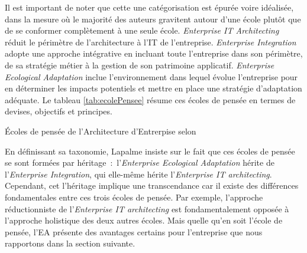 
Il est important de noter que cette une catégorisation est épurée voire 
idéalisée, 
dans la mesure où le majorité des auteurs gravitent autour d'une école plutôt 
que 
de se conformer complètement à une seule école. \textit{Enterprise IT 
Architecting} réduit le périmètre de l'architecture à l'IT de l'entreprise. 
\textit{Enterprise Integration} adopte une approche intégrative en incluant 
toute l'entreprise dans son périmètre, de sa stratégie métier à la gestion de 
son 
patrimoine applicatif. \textit{Enterprise Ecological Adaptation} inclue 
l'environnement dans lequel évolue l'entreprise pour en déterminer les impacts 
potentiels et mettre en place une stratégie d'adaptation adéquate. Le tableau 
\ref{tab:ecolePensee} résume ces écoles de pensée en termes de devises, 
objectifs et principes. 

\begin{table}[!htbp]
		
	\caption{Écoles de pensée de l'Architecture d'Entrerpise selon
\protect\cite{lapalme2012three}}
 	\label{tab:ecolePensee}
\end{table}

En définissant sa taxonomie, Lapalme insiste sur le fait que ces écoles de 
pensée se sont formées par héritage~:~l'\textit{Enterprise Ecological 
Adaptation} hérite de l'\textit{Enterprise Integration}, qui elle-même hérite 
l'\textit{Enterprise IT architecting}. Cependant, cet l'héritage implique une 
transcendance car il existe des différences fondamentales entre ces trois écoles 
de pensée. Par exemple, l'approche réductionniste de l'\textit{Enterprise IT 
architecting} est fondamentalement opposée à l'approche holistique des deux 
autres écoles. Mais quelle qu'en soit l'école de pensée, l'EA présente des 
avantages certains pour l'entreprise que nous rapportons dans la section 
suivante. 


